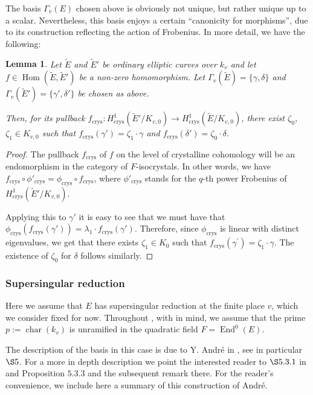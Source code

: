 \documentclass[12pt,twoside,a4paper]{article}
\theoremstyle{plain}%
\newtheorem{lemma}[theorem]{Lemma}
\DeclareMathOperator{\homm}{Hom}
\DeclareMathOperator{\End}{End}
\DeclareMathOperator{\chara}{char}
\DeclareMathOperator{\crys}{crys}
\begin{document}
	The basis $\Gamma_v(E)$ chosen above is obviously not unique, but rather unique up to a scalar. 
Nevertheless, this basis enjoys a certain ``canonicity for morphisms'', due to its construction reflecting the action of Frobenius. In more detail, we have the following:
\begin{lemma}\label{lemmacrysordbasis}Let $\tilde{E}$ and $\tilde{E}'$ be ordinary elliptic curves over $k_v$ and let $f\in \homm(\tilde{E},\tilde{E}')$ be a non-zero homomorphism. Let $\Gamma_v(\tilde{E})=\{\gamma,\delta\}$ and $\Gamma_v(\tilde{E}')=\{\gamma',\delta'\}$ be chosen as above. 
	
	Then, for its pullback $f_{\crys}:H^1_{\crys}(\tilde{E}'/K_{v,0})\rightarrow H^1_{\crys}(\tilde{E}/K_{v,0})$, there exist $\zeta_0$, $\zeta_1\in K_{v,0}$ such that $f_{\crys}(\gamma')=\zeta_1\cdot \gamma$ and $f_{\crys}(\delta')=\zeta_0\cdot \delta$.
\end{lemma}
\begin{proof} The pullback $f_{\crys}$ of $f$ on the level of crystalline cohomology will be an endomorphism in the category of $F$-isocrystals. In other words, we have $f_{\crys}\circ\phi'_{\crys} =\phi_{\crys}\circ f_{\crys}$, where $\phi'_{\crys}$ stands for the $q$-th power Frobenius of $H^1_{\crys}(\tilde{E}'/K_{v,0})$.
	
	 Applying this to $\gamma'$ it is easy to see that we must have that $\phi_{\crys}( f_{\crys}(\gamma'))= \lambda_1\cdot f_{\crys}(\gamma')$. Therefore, since $\phi_{\crys}$ is linear with distinct eigenvalues, we get that there exists $\zeta_1\in K_0$ such that $f_{\crys}(\gamma^{\prime})=\zeta_1\cdot \gamma$. The existence of $\zeta_0$ for $\delta$ follows similarly.
\end{proof}

\subsubsection{Supersingular reduction}\label{section:supersingbases}

Here we assume that $E$ has supersingular reduction at the finite place $v$, which we consider fixed for now. Throughout , with  in mind, we assume that the prime $p:=\chara(k_v)$ is unramified in the quadratic field $F=\End^{0}(E)$. 

The description of the basis in this case is due to Y. Andr\'e in \cite{andremots}, see in particular $\S 5$. For a more in depth description we point the interested reader to $\S 5.3.1$ in \cite{andremsj} and Proposition $5.3.3$ and the subsequent remark there. For the reader's convenience, we include here a summary of this construction of Andr\'e.\\
\end{document}
